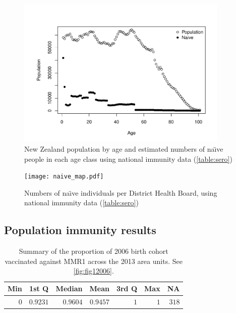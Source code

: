\documentclass{article}
\begin{document}
\begin{figure}
\begin{center}
     \includegraphics[width=0.9\textwidth]{naive_allPop.pdf}
\end{center}
\caption{New Zealand population by age and estimated numbers of na\"{\i}ve people in each age class using national immunity data (\autoref{table:sero})}
\label{fig:naive}
\end{figure}

\begin{figure}
     \begin{center}
     \texttt{[image: naive\_map.pdf]}
     \end{center}
     \caption{Numbers of na\"{\i}ve individuals per District Health Board, using national immunity data (\autoref{table:sero})}
     \label{fig:naive_map}
\end{figure}

\subsection{Population immunity results}
\label{sub:popim}

 \vspace{5mm} %
\begin{table}
\begin{center}
\begin{tabular}{rrrrrrr}
\hline\hline
\multicolumn{1}{c}{Min}&\multicolumn{1}{c}{1st Q}&\multicolumn{1}{c}{Median}&\multicolumn{1}{c}{Mean}&\multicolumn{1}{c}{3rd Q}&\multicolumn{1}{c}{Max}&\multicolumn{1}{c}{NA}\tabularnewline
\hline
$0$&$0.9231$&$0.9604$&$0.9457$&$1$&$1$&$318$\tabularnewline
\hline
\end{tabular}\end{center}\caption{Summary of the proportion of 2006 birth cohort vaccinated against MMR1 across the 2013 area units. See \autoref{fig:fig12006}.}
\label{table:tab12006}
\end{table}
\end{document}
